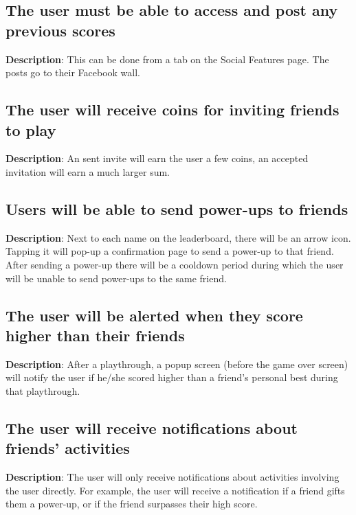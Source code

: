 \subsection{The user must be able to access and post any previous scores}
\textbf{Description}: This can be done from a tab on the Social Features
page. The posts go to their Facebook wall.

\subsection{The user will receive coins for inviting friends to play}
\textbf{Description}: An sent invite will earn the user a few coins,
an accepted invitation will earn a much larger sum. 

\subsection{Users will be able to send power-ups to friends}
\textbf{Description}: Next to each name on the leaderboard, there
will be an arrow icon. Tapping it will pop-up a confirmation page
to send a power-up to that friend. After sending a power-up there
will be a cooldown period during which the user will be unable to
send power-ups to the same friend.

\subsection{The user will be alerted when they score higher than their
friends}
\textbf{Description}: After a playthrough, a popup screen (before
the game over screen) will notify the user if he/she scored higher
than a friend\textquoteright{}s personal best during that playthrough.

\subsection{The user will receive notifications about friends\textquoteright{}
activities}
\textbf{Description}: The user will only receive notifications about
activities involving the user directly. For example, the user will
receive a notification if a friend gifts them a power-up, or if the
friend surpasses their high score.

